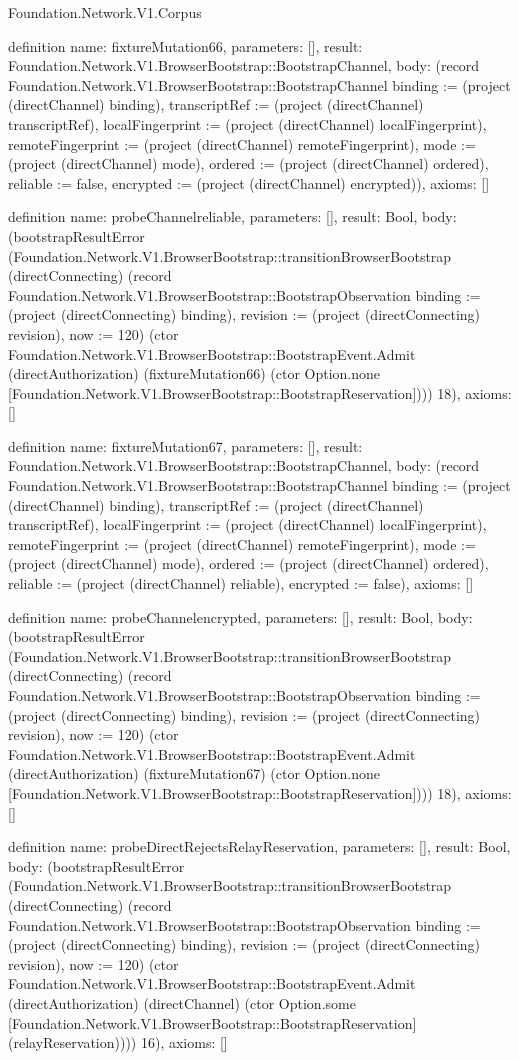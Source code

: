 \begin{lexlean}{Foundation.Network.V1.Corpus}
\begin{semanticmodule}
definition{
  name: fixtureMutation66,
  parameters: [],
  result: Foundation.Network.V1.BrowserBootstrap::BootstrapChannel,
  body: (record Foundation.Network.V1.BrowserBootstrap::BootstrapChannel {binding := (project (directChannel) binding), transcriptRef := (project (directChannel) transcriptRef), localFingerprint := (project (directChannel) localFingerprint), remoteFingerprint := (project (directChannel) remoteFingerprint), mode := (project (directChannel) mode), ordered := (project (directChannel) ordered), reliable := false, encrypted := (project (directChannel) encrypted)}),
  axioms: []
}

definition{
  name: probeChannelreliable,
  parameters: [],
  result: Bool,
  body: (bootstrapResultError (Foundation.Network.V1.BrowserBootstrap::transitionBrowserBootstrap (directConnecting) (record Foundation.Network.V1.BrowserBootstrap::BootstrapObservation {binding := (project (directConnecting) binding), revision := (project (directConnecting) revision), now := 120}) (ctor Foundation.Network.V1.BrowserBootstrap::BootstrapEvent.Admit (directAuthorization) (fixtureMutation66) (ctor Option.none [Foundation.Network.V1.BrowserBootstrap::BootstrapReservation]))) 18),
  axioms: []
}

definition{
  name: fixtureMutation67,
  parameters: [],
  result: Foundation.Network.V1.BrowserBootstrap::BootstrapChannel,
  body: (record Foundation.Network.V1.BrowserBootstrap::BootstrapChannel {binding := (project (directChannel) binding), transcriptRef := (project (directChannel) transcriptRef), localFingerprint := (project (directChannel) localFingerprint), remoteFingerprint := (project (directChannel) remoteFingerprint), mode := (project (directChannel) mode), ordered := (project (directChannel) ordered), reliable := (project (directChannel) reliable), encrypted := false}),
  axioms: []
}

definition{
  name: probeChannelencrypted,
  parameters: [],
  result: Bool,
  body: (bootstrapResultError (Foundation.Network.V1.BrowserBootstrap::transitionBrowserBootstrap (directConnecting) (record Foundation.Network.V1.BrowserBootstrap::BootstrapObservation {binding := (project (directConnecting) binding), revision := (project (directConnecting) revision), now := 120}) (ctor Foundation.Network.V1.BrowserBootstrap::BootstrapEvent.Admit (directAuthorization) (fixtureMutation67) (ctor Option.none [Foundation.Network.V1.BrowserBootstrap::BootstrapReservation]))) 18),
  axioms: []
}

definition{
  name: probeDirectRejectsRelayReservation,
  parameters: [],
  result: Bool,
  body: (bootstrapResultError (Foundation.Network.V1.BrowserBootstrap::transitionBrowserBootstrap (directConnecting) (record Foundation.Network.V1.BrowserBootstrap::BootstrapObservation {binding := (project (directConnecting) binding), revision := (project (directConnecting) revision), now := 120}) (ctor Foundation.Network.V1.BrowserBootstrap::BootstrapEvent.Admit (directAuthorization) (directChannel) (ctor Option.some [Foundation.Network.V1.BrowserBootstrap::BootstrapReservation] (relayReservation)))) 16),
  axioms: []
}


\end{semanticmodule}
\end{lexlean}
